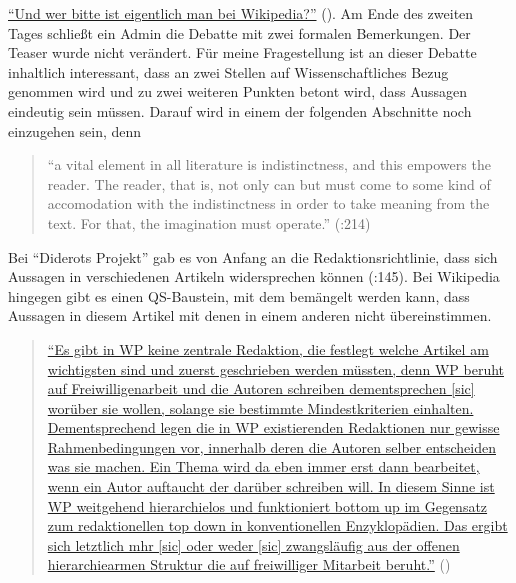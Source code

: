\documentclass[fontsize=12pt]{scrartcl}
\begin{document}
\href{https://de.wikipedia.org/w/index.php?title=Wikipedia_Diskussion:Hauptseite&type=revision&diff=138151607&oldid=138138024}{"`Und wer bitte ist eigentlich \flq man\frq \,\,bei Wi\-ki\-pe\-dia?"'} (\cite{User188.106.99.552015}). Am Ende des zwei\-ten Tages schlie{\ss}t ein Admin die Debatte mit zwei formalen Bemerkungen. Der Teaser wurde nicht ver\"andert. F\"ur meine Fragestellung ist an dieser Debatte inhaltlich interessant, dass an zwei Stellen auf Wissenschaftliches Bezug genommen wird und zu zwei weiteren Punkten betont wird, dass Aussagen eindeutig sein m\"ussen. Darauf wird in einem der folgenden Abschnitte noch einzugehen sein, denn

\singlespacing
\begin{quote}
"`a vital element in all literature is indistinctness, and this empowers the reader. The reader, that is, not only can but must come to some kind of accomodation with the indistinctness in order to take meaning from the text. For that, the imagination must operate."' (\cite{Carey2005}:214)
\end{quote}
\onehalfspacing

Bei "`Diderots Projekt"' gab es von Anfang an die Redaktionsrichtlinie, dass sich Aussagen in verschiedenen Artikeln widersprechen k\"onnen (\cite{Blom2004}:145). Bei Wi\-ki\-pe\-dia hingegen gibt es einen QS-Baustein, mit dem bem\"angelt werden kann, dass Aussagen in diesem Artikel mit denen in einem anderen nicht \"ubereinstimmen.

\singlespacing
\begin{quote}
\href{https://de.wikipedia.org/w/index.php?title=Wikipedia_Diskussion:Redaktion_Musik\&diff=137580712\&oldid=137579206}{"`Es gibt in WP keine zentrale Redaktion, die festlegt welche Artikel am wichtigsten sind und zuerst geschrieben werden m\"ussten, denn WP beruht auf Freiwilligenarbeit und die Autoren schrei\-ben dementsprechen [sic] wor\"uber sie wollen, solange sie bestimmte Mindestkriterien einhalten. Dementsprechend legen die in WP existierenden Redaktionen nur gewisse Rahmenbedingungen vor, innerhalb deren die Autoren selber entscheiden was sie machen. Ein Thema wird da eben immer erst dann bearbeitet, wenn ein Autor auftaucht der dar\"uber schrei\-ben will. In diesem Sinne ist WP weitgehend hierarchielos und funktioniert \flq bottom up\frq \,\,im Gegensatz zum redaktionellen \flq top down\frq \,\,in konventionellen Enzyklop\"adien. Das ergibt sich letzt\-lich mhr [sic] oder weder [sic] zwangsl\"aufig aus der offenen hierarchiearmen Struktur die auf freiwilliger Mitarbeit beruht."'} (\cite{UserKmhkmh2015})
\end{quote}
\onehalfspacing 
\end{document}
